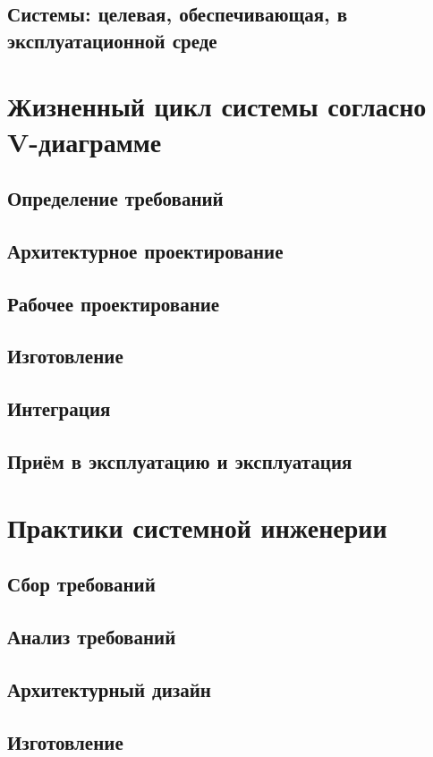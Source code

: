\documentclass[bibliography=totocnumbered]{scrartcl}
\begin{document}
\subsection{Системы: целевая, обеспечивающая, в эксплуатационной среде}

\section{Жизненный цикл системы согласно V-диаграмме}
\subsection{Определение требований}
\subsection{Архитектурное проектирование}
\subsection{Рабочее проектирование}
\subsection{Изготовление}
\subsection{Интеграция}
\subsection{Приём в эксплуатацию и эксплуатация}

\section{Практики системной инженерии}

\subsection{Сбор требований}
\subsection{Анализ требований}
\subsection{Архитектурный дизайн}
\subsection{Изготовление}
\end{document}
